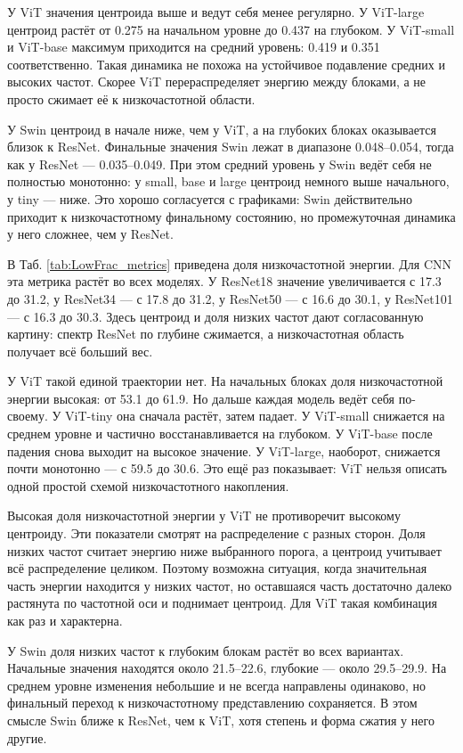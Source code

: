 У ViT значения центроида выше и ведут себя менее регулярно. У ViT-large центроид растёт от 0.275 на начальном уровне до 0.437 на глубоком. У ViT-small и ViT-base максимум приходится на средний уровень: 0.419 и 0.351 соответственно. Такая динамика не похожа на устойчивое подавление средних и высоких частот. Скорее ViT перераспределяет энергию между блоками, а не просто сжимает её к низкочастотной области.

У Swin центроид в начале ниже, чем у ViT, а на глубоких блоках оказывается близок к ResNet. Финальные значения Swin лежат в диапазоне 0.048--0.054, тогда как у ResNet — 0.035--0.049. При этом средний уровень у Swin ведёт себя не полностью монотонно: у small, base и large центроид немного выше начального, у tiny — ниже. Это хорошо согласуется с графиками: Swin действительно приходит к низкочастотному финальному состоянию, но промежуточная динамика у него сложнее, чем у ResNet.

В Таб. \ref{tab:LowFrac_metrics} приведена доля низкочастотной энергии. Для CNN эта метрика растёт во всех моделях. У ResNet18 значение увеличивается с 17.3 до 31.2, у ResNet34 — с 17.8 до 31.2, у ResNet50 — с 16.6 до 30.1, у ResNet101 — с 16.3 до 30.3. Здесь центроид и доля низких частот дают согласованную картину: спектр ResNet по глубине сжимается, а низкочастотная область получает всё больший вес.

У ViT такой единой траектории нет. На начальных блоках доля низкочастотной энергии высокая: от 53.1 до 61.9. Но дальше каждая модель ведёт себя по-своему. У ViT-tiny она сначала растёт, затем падает. У ViT-small снижается на среднем уровне и частично восстанавливается на глубоком. У ViT-base после падения снова выходит на высокое значение. У ViT-large, наоборот, снижается почти монотонно — с 59.5 до 30.6. Это ещё раз показывает: ViT нельзя описать одной простой схемой низкочастотного накопления.

Высокая доля низкочастотной энергии у ViT не противоречит высокому центроиду. Эти показатели смотрят на распределение с разных сторон. Доля низких частот считает энергию ниже выбранного порога, а центроид учитывает всё распределение целиком. Поэтому возможна ситуация, когда значительная часть энергии находится у низких частот, но оставшаяся часть достаточно далеко растянута по частотной оси и поднимает центроид. Для ViT такая комбинация как раз и характерна.

У Swin доля низких частот к глубоким блокам растёт во всех вариантах. Начальные значения находятся около 21.5--22.6, глубокие — около 29.5--29.9. На среднем уровне изменения небольшие и не всегда направлены одинаково, но финальный переход к низкочастотному представлению сохраняется. В этом смысле Swin ближе к ResNet, чем к ViT, хотя степень и форма сжатия у него другие.

